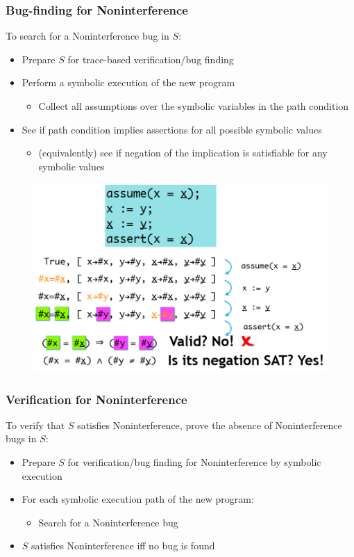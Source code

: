 \documentclass[10pt,a4paper]{report}
\begin{document}
\subsubsection{Bug-finding for Noninterference}
To search for a Noninterference bug in $S$:
\begin{itemize}
\item Prepare $S$ for trace-based verification/bug finding
\item Perform a symbolic execution of the new program
\begin{itemize}
\item Collect all assumptions over the symbolic variables in the path condition
\end{itemize}
\item See if path condition implies assertions for all possible symbolic values
\begin{itemize}
\item (equivalently) see if negation of the implication is satisfiable for any symbolic values
\end{itemize}
\end{itemize}
\begin{figure}[H]
\centering
\includegraphics[scale=0.4]{40.png}
\end{figure}
\subsubsection{Verification for Noninterference}
To verify that $S$ satisfies Noninterference, prove the absence of Noninterference bugs in $S$:
\begin{itemize}
\item Prepare $S$ for verification/bug finding for Noninterference by symbolic execution
\item For each symbolic execution path of the new program:
\begin{itemize}
\item Search for a Noninterference bug
\end{itemize}
\item $S$ satisfies Noninterference iff no bug is found
\end{itemize}
\end{document}
